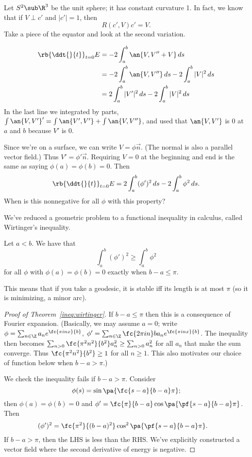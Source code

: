 \begin{ex}
Let $S^2\sub \R^3$ be the unit sphere; it has constant curvature 1. In fact, we know that if $V\perp c'$ and $|c'|=1$, then
\[
R(c',V)c'=V.
\]
Take a piece of the equator and look at the second variation.

\begin{align*}
\rb{\ddt{}{t}}_{t=0} E
&=-2\int_a^b \an{V,V''+V}\,ds\\
&=-2\int_a^b \an{V,V''}\,ds-2\int_a^b |V|^2 \,ds\\
&=2 \int_a^b |V'|^2\,ds-2\int_a^b |V|^2\,ds%
\end{align*}
In the last line we integrated by parts, $\int\an{V,V'}'=\int\an{V',V'}+\int\an{V,V''}$, and used that $\an{V,V'}$ is 0 at $a$ and $b$ because $V'$ is 0.

Since we're on a surface, we can write $V=\phi\vec n$. (The normal is also a parallel vector field.) Thus $V'=\phi'\vec n$. Requiring $V=0$ at the beginning and end is the same as saying $\phi(a)=\phi(b)=0$.
Then
\[
\rb{\ddt{}{t}}_{t=0} E=2\int_a^b (\phi')^2\,ds -2\int_a^b \phi^2\,ds.
\]
When is this nonnegative for all $\phi$ with this property?

We've reduced a geometric problem to a functional inequality in calculus, called Wirtinger's inequality. 
\begin{thm}
Let $a<b$. We have that
\[\int_a^b(\phi')^2\ge \int_a^b \phi^2\]
for all $\phi$ with $\phi(a)=\phi(b)=0$ exactly when $b-a\le \pi$.
\end{thm}

This means that if you take a geodesic, it is stable iff its length is at most $\pi$ (so it is minimizing, a minor arc).

\begin{proof}[Proof of Theorem~\ref{ineq:wirtinger}]
If $b-a\le\pi$ then this is a consequence of Fourier expansion. (Basically, we may assume $a=0$; write $\phi=\sum_{n\in \Z}a_ne^{\fc{\pi inx}{b}}$, $\phi'=\sum_{n\in \Z}\fc{2\pi i n}ba_n e^{\fc{\pi inx}{b}}$. The inequality then becomes $\sum_{n>0}\fc{\pi^2 n^2}{b^2}a_n^2\ge \sum_{n>0}a_n^2$ for all $a_n$ that make the sum converge. Thus $\fc{\pi^2 n^2}{b^2}\ge 1$ for all $n\ge1$. This also motivates our choice of function below when $b-a>\pi$.)

We check the inequality fails if $b-a>\pi$. %
Consider 
\[\phi(s) = \sin \pa{\fc{s-a}{b-a}\pi};\]
then $\phi(a)=\phi(b)=0$ and $\phi'=\fc{\pi}{b-a}\cos\pa{\pf{s-a}{b-a}\pi}$. Then
\begin{align*}
(\phi')^2&=\fc{\pi^2}{(b-a)^2} \cos^2\pa{ \pf{s-a}{b-a} \pi}.
\end{align*}
If $b-a>\pi$, then the LHS is less than the RHS. We've explicitly constructed a vector field where the second derivative of energy is negative. %
\end{proof}
\end{ex}